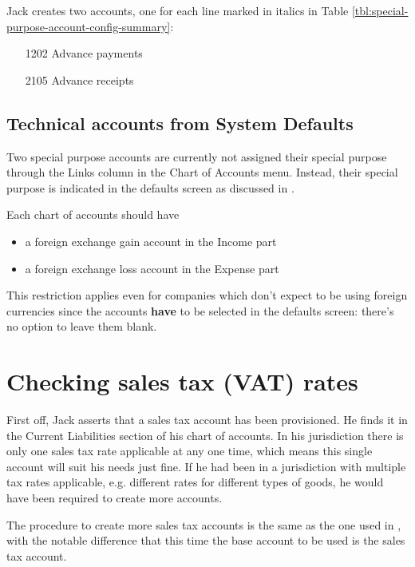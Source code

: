 Jack creates two accounts, one for each line marked in italics in Table \ref{tbl:special-purpose-account-config-summary}:
\begin{itemize}
\item [1202] Advance payments
\item [2105] Advance receipts
\end{itemize}


\subsection{Technical accounts from System Defaults}
\label{subsec:technical-accounts-system-defaults}

Two special purpose accounts are currently not assigned their special purpose through
the Links column in the Chart of Accounts menu. Instead, their special purpose is indicated
in the defaults screen as discussed in .

Each chart of accounts should have
\begin{itemize}
\item a foreign exchange gain account in the Income part
\item a foreign exchange loss account in the Expense part
\end{itemize}

This restriction applies even for companies which don't expect to be using foreign currencies
since the accounts \textbf{have} to be selected in the defaults screen: there's no option
to leave them blank.

\section{Checking sales tax (VAT) rates}

First off, Jack asserts that a sales tax account has been provisioned. He finds it
in the Current Liabilities section of his chart of accounts. In his jurisdiction there
is only one sales tax rate applicable at any one time, which means this single account
will suit his needs just fine. If he had been in a jurisdiction with multiple tax rates
applicable, e.g. different rates for different types of goods, he would have been
required to create more accounts.

The procedure to create more sales tax accounts is the same as the one used in
, with the notable difference that this time the base account
to be used is the sales tax account.

